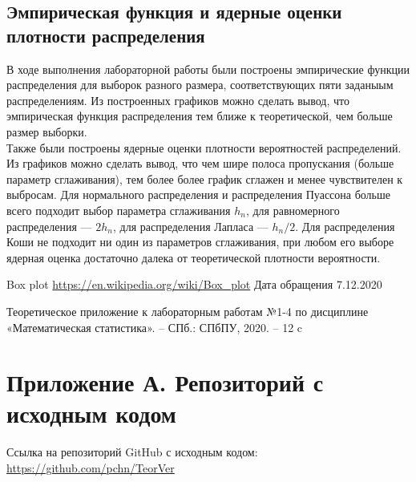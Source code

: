 \documentclass[12pt]{article}
\begin{document}
\subsection{Эмпирическая функция и ядерные оценки плотности распределения}
В ходе выполнения лабораторной работы были построены эмпирические функции распределения для выборок разного размера, соответствующих пяти заданыым распределениям. Из построенных графиков можно сделать вывод, что эмпирическая функция распределения тем ближе к теоретической, чем больше размер выборки.\\
Также были построены ядерные оценки плотности вероятностей распределений. Из графиков можно сделать вывод, что чем шире полоса пропускания (больше параметр сглаживания), тем более более график сглажен и менее чувствителен к выбросам. Для нормального распределения и распределения Пуассона больше всего подходит выбор параметра сглаживания $h_n$, для равномерного распределения --- $2h_n$, для распределения Лапласа --- $h_n/2$. Для распределения Коши не подходит ни один из параметров сглаживания, при любом его выборе ядерная оценка достаточно далека от теоретической плотности вероятности.
\newpage
{}
\begin{thebibliography}{9}

	Box plot \url{https://en.wikipedia.org/wiki/Box_plot} Дата обращения 7.12.2020

	Теоретическое приложение к лабораторным работам №1-4 по дисциплине «Математическая статистика». -- СПб.: СПбПУ, 2020. -- 12 c 

\end{thebibliography}
\newpage
\section*{\hypertarget{addition}{Приложение А. Репозиторий с исходным кодом}}
Ссылка на репозиторий GitHub с исходным кодом: \url{https://github.com/pchn/TeorVer}
\end{document}
